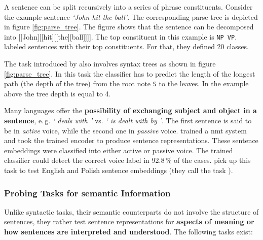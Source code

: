   A sentence can be split recursively into a series of phrase constituents. Consider the example sentence \textit{`John hit the ball'}. The corresponding parse tree is depicted in figure \vref{fig:parse_tree}. The figure shows that the sentence can be decomposed into [[John][[hit][[the][ball]]]]. The top constituent in this example is \texttt{NP VP}. \citep{Shi.2016} labeled sentences with their top constituents. For that, they defined 20 classes. 



  The task introduced by \citep{Conneau.2018b} also involves syntax trees as shown in figure \vref{fig:parse_tree}. In this task the classifier has to predict the length of the longest path (the depth of the tree) from the root note \texttt{S} to the leaves. In the example above the tree depth is equal to 4.

  Many languages offer the \textbf{possibility of exchanging subject and object in a sentence}, e.\,g. \textit{` deals with '} vs. \textit{` is dealt with by '}. The first sentence is said to be in \textit{active} voice, while the second one in \textit{passive} voice. \citep{Shi.2016} trained a \gls{nmt} system and took the trained encoder to produce sentence representations. These sentence embeddings were classified into either active or passive voice. The trained classifier could detect the correct voice label in 92.8\,\% of the cases. \citep{Krasnowska.2019} pick up this task to test English and Polish sentence embeddings (they call the task ).

\subsubsection{Probing Tasks for semantic Information}
\label{sec:presentation_probing_tasks_semantic}

Unlike syntactic tasks, their semantic counterparts do not involve the structure of sentences, they rather test sentence representations for \textbf{aspects of meaning or how sentences are interpreted and understood}. The following tasks exist:

